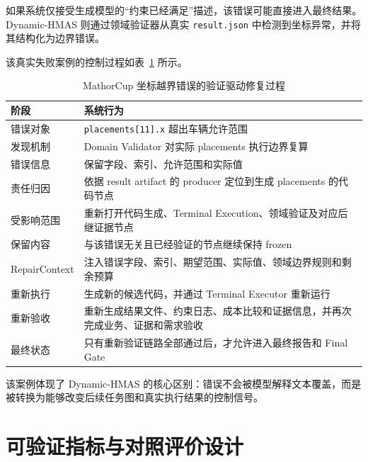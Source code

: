 \documentclass[UTF8,a4paper,12pt,oneside]{ctexbook}
\begin{document}
如果系统仅接受生成模型的“约束已经满足”描述，该错误可能直接进入最终结果。Dynamic-HMAS 则通过领域验证器从真实 \texttt{result.json} 中检测到坐标异常，并将其结构化为边界错误。

该真实失败案例的控制过程如表~\ref{tab:real-repair-case} 所示。

\begin{table}[htbp]
\centering
\caption{MathorCup 坐标越界错误的验证驱动修复过程}
\label{tab:real-repair-case}
\begin{tabularx}{0.96\textwidth}{p{}X}
\toprule
阶段 & 系统行为\\
\midrule

错误对象
&
\texttt{placements[11].x} 超出车辆允许范围\\

发现机制
&
Domain Validator 对实际 placements 执行边界复算\\

错误信息
&
保留字段、索引、允许范围和实际值\\

责任归因
&
依据 result artifact 的 producer 定位到生成 placements 的代码节点\\

受影响范围
&
重新打开代码生成、Terminal Execution、领域验证及对应后继证据节点\\

保留内容
&
与该错误无关且已经验证的节点继续保持 frozen\\

RepairContext
&
注入错误字段、索引、期望范围、实际值、领域边界规则和剩余预算\\

重新执行
&
生成新的候选代码，并通过 Terminal Executor 重新运行\\

重新验收
&
重新生成结果文件、约束日志、成本比较和证据信息，并再次完成业务、证据和需求验收\\

最终状态
&
只有重新验证链路全部通过后，才允许进入最终报告和 Final Gate\\

\bottomrule
\end{tabularx}
\end{table}

该案例体现了 Dynamic-HMAS 的核心区别：错误不会被模型解释文本覆盖，而是被转换为能够改变后续任务图和真实执行结果的控制信号。


\section{可验证指标与对照评价设计}
\end{document}
